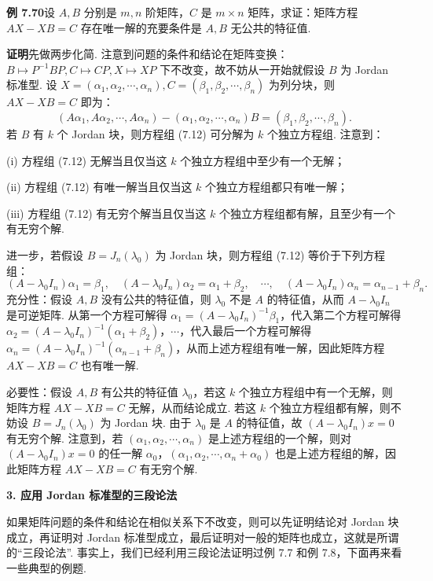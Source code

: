 \documentclass[UTF8,12pt,a4paper,fontset=fandol]{ctexart}
\begin{document}
\noindent\textbf{例 7.70}\quad 设 $A,B$ 分别是 $m,n$ 阶矩阵，$C$ 是 $m\times n$ 矩阵，求证：矩阵方程 $AX-XB=C$ 存在唯一解的充要条件是 $A,B$ 无公共的特征值.

\noindent\textbf{证明}\quad 先做两步化简. 注意到问题的条件和结论在矩阵变换：$B\mapsto P^{-1}BP,C\mapsto CP,X\mapsto XP$ 下不改变，故不妨从一开始就假设 $B$ 为 Jordan 标准型. 设 $X=(\alpha_1,\alpha_2,\cdots,\alpha_n),C=(\beta_1,\beta_2,\cdots,\beta_n)$ 为列分块，则 $AX-XB=C$ 即为：
\begin{equation}
(A\alpha_1,A\alpha_2,\cdots,A\alpha_n)-(\alpha_1,\alpha_2,\cdots,\alpha_n)B=(\beta_1,\beta_2,\cdots,\beta_n).
\tag{7.12}
\end{equation}
若 $B$ 有 $k$ 个 Jordan 块，则方程组 (7.12) 可分解为 $k$ 个独立方程组. 注意到：

(i) 方程组 (7.12) 无解当且仅当这 $k$ 个独立方程组中至少有一个无解；

(ii) 方程组 (7.12) 有唯一解当且仅当这 $k$ 个独立方程组都只有唯一解；

(iii) 方程组 (7.12) 有无穷个解当且仅当这 $k$ 个独立方程组都有解，且至少有一个有无穷个解.

进一步，若假设 $B=J_n(\lambda_0)$ 为 Jordan 块，则方程组 (7.12) 等价于下列方程组：
\[
(A-\lambda_0I_n)\alpha_1=\beta_1,\quad (A-\lambda_0I_n)\alpha_2=\alpha_1+\beta_2,\quad \cdots,\quad (A-\lambda_0I_n)\alpha_n=\alpha_{n-1}+\beta_n.
\]
充分性：假设 $A,B$ 没有公共的特征值，则 $\lambda_0$ 不是 $A$ 的特征值，从而 $A-\lambda_0I_n$ 是可逆矩阵. 从第一个方程可解得 $\alpha_1=(A-\lambda_0I_n)^{-1}\beta_1$，代入第二个方程可解得 $\alpha_2=(A-\lambda_0I_n)^{-1}(\alpha_1+\beta_2)$，$\cdots$，代入最后一个方程可解得 $\alpha_n=(A-\lambda_0I_n)^{-1}(\alpha_{n-1}+\beta_n)$，从而上述方程组有唯一解，因此矩阵方程 $AX-XB=C$ 也有唯一解.

必要性：假设 $A,B$ 有公共的特征值 $\lambda_0$，若这 $k$ 个独立方程组中有一个无解，则矩阵方程 $AX-XB=C$ 无解，从而结论成立. 若这 $k$ 个独立方程组都有解，则不妨设 $B=J_n(\lambda_0)$ 为 Jordan 块. 由于 $\lambda_0$ 是 $A$ 的特征值，故 $(A-\lambda_0I_n)x=0$ 有无穷个解. 注意到，若 $(\alpha_1,\alpha_2,\cdots,\alpha_n)$ 是上述方程组的一个解，则对 $(A-\lambda_0I_n)x=0$ 的任一解 $\alpha_0$，$(\alpha_1,\alpha_2,\cdots,\alpha_n+\alpha_0)$ 也是上述方程组的解，因此矩阵方程 $AX-XB=C$ 有无穷个解.

\noindent\textbf{3. 应用 Jordan 标准型的三段论法}

如果矩阵问题的条件和结论在相似关系下不改变，则可以先证明结论对 Jordan 块成立，再证明对 Jordan 标准型成立，最后证明对一般的矩阵也成立，这就是所谓的“三段论法”. 事实上，我们已经利用三段论法证明过例 7.7 和例 7.8，下面再来看一些典型的例题.
\end{document}

